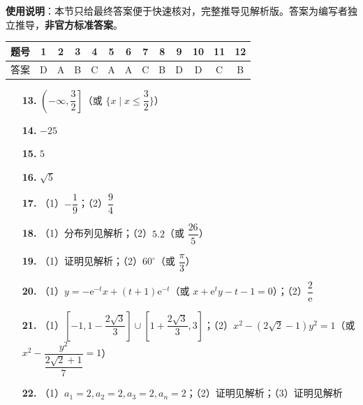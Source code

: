 
\begin{gknotice}
\textbf{使用说明}：本节只给最终答案便于快速核对，完整推导见解析版。答案为编写者独立推导，\textbf{非官方标准答案}。
\end{gknotice}

\begin{center}\begin{tabular}{ccccccccccccc}
\toprule
题号 & 1 & 2 & 3 & 4 & 5 & 6 & 7 & 8 & 9 & 10 & 11 & 12 \\
\midrule
答案 & D & A & B & C & A & A & C & B & D & D & C & B \\
\bottomrule
\end{tabular}\end{center}

\begin{itemize}[leftmargin=2.6em]
  \item[\textbf{13.}] $\left(-\infty, \dfrac{3}{2}\right]$（或 $\{x \mid x \leqslant \dfrac{3}{2}\}$）
  \item[\textbf{14.}] $-25$
  \item[\textbf{15.}] $5$
  \item[\textbf{16.}] $\sqrt{5}$
\end{itemize}

\begin{itemize}[leftmargin=2.6em]
  \item[\textbf{17.}] （1）$-\dfrac{1}{9}$；（2）$\dfrac{9}{4}$
  \item[\textbf{18.}] （1）分布列见解析；（2）$5.2$（或 $\dfrac{26}{5}$）
  \item[\textbf{19.}] （1）证明见解析；（2）$60^\circ$（或 $\dfrac{\pi}{3}$）
  \item[\textbf{20.}] （1）$y = -\mathrm{e}^{-t}x + (t+1)\mathrm{e}^{-t}$（或 $x + \mathrm{e}^t y - t - 1 = 0$）；（2）$\dfrac{2}{\mathrm{e}}$
  \item[\textbf{21.}] （1）$\left[-1, 1 - \dfrac{2\sqrt{3}}{3}\right] \cup \left[1 + \dfrac{2\sqrt{3}}{3}, 3\right]$；（2）$x^2 - (2\sqrt{2}-1)y^2 = 1$（或 $x^2 - \dfrac{y^2}{\dfrac{2\sqrt{2}+1}{7}} = 1$）
  \item[\textbf{22.}] （1）$a_1 = 2, a_2 = 2, a_3 = 2, a_n = 2$；（2）证明见解析；（3）证明见解析
\end{itemize}
